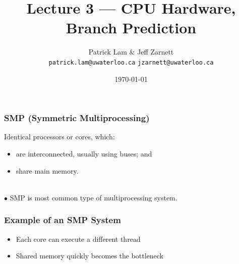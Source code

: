 

\title{Lecture 3 --- CPU Hardware, Branch Prediction }

\author{Patrick Lam \& Jeff Zarnett \\ \small \texttt{patrick.lam@uwaterloo.ca} \texttt{jzarnett@uwaterloo.ca}}
\date{\today}




\begin{frame}
  \titlepage

 \end{frame}


\begin{frame}
  \frametitle{SMP (Symmetric Multiprocessing)}

    Identical processors or cores, which:
    \begin{itemize}
    \item are interconnected, usually using buses; and
    \item share main memory.
    \end{itemize}
    ~\\[1em]
    $\bullet$ SMP is most common type of multiprocessing system.

\end{frame}

\begin{frame}
  \frametitle{Example of an SMP System}
\begin{center}
\end{center}

  \begin{itemize}
    \item Each core can execute a different thread
    \item Shared memory quickly becomes the bottleneck
  \end{itemize}
\end{frame}

